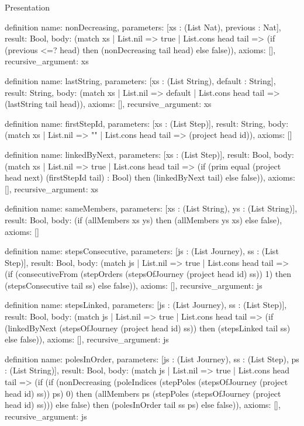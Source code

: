 \begin{lexlean}{Presentation}
\begin{semanticmodule}
definition{
  name: nonDecreasing,
  parameters: [xs : (List Nat), previous : Nat],
  result: Bool,
  body: (match xs
    | List.nil => true
    | List.cons head tail => (if (previous <=? head) then (nonDecreasing tail head) else false)),
  axioms: [],
  recursive_argument: xs
}

definition{
  name: lastString,
  parameters: [xs : (List String), default : String],
  result: String,
  body: (match xs
    | List.nil => default
    | List.cons head tail => (lastString tail head)),
  axioms: [],
  recursive_argument: xs
}

definition{
  name: firstStepId,
  parameters: [xs : (List Step)],
  result: String,
  body: (match xs
    | List.nil => ""
    | List.cons head tail => (project head id)),
  axioms: []
}

definition{
  name: linkedByNext,
  parameters: [xs : (List Step)],
  result: Bool,
  body: (match xs
    | List.nil => true
    | List.cons head tail => (if (prim equal (project head next) (firstStepId tail) : Bool) then (linkedByNext tail) else false)),
  axioms: [],
  recursive_argument: xs
}

definition{
  name: sameMembers,
  parameters: [xs : (List String), ys : (List String)],
  result: Bool,
  body: (if (allMembers xs ys) then (allMembers ys xs) else false),
  axioms: []
}

definition{
  name: stepsConsecutive,
  parameters: [js : (List Journey), ss : (List Step)],
  result: Bool,
  body: (match js
    | List.nil => true
    | List.cons head tail => (if (consecutiveFrom (stepOrders (stepsOfJourney (project head id) ss)) 1) then (stepsConsecutive tail ss) else false)),
  axioms: [],
  recursive_argument: js
}

definition{
  name: stepsLinked,
  parameters: [js : (List Journey), ss : (List Step)],
  result: Bool,
  body: (match js
    | List.nil => true
    | List.cons head tail => (if (linkedByNext (stepsOfJourney (project head id) ss)) then (stepsLinked tail ss) else false)),
  axioms: [],
  recursive_argument: js
}

definition{
  name: polesInOrder,
  parameters: [js : (List Journey), ss : (List Step), ps : (List String)],
  result: Bool,
  body: (match js
    | List.nil => true
    | List.cons head tail => (if (if (nonDecreasing (poleIndices (stepPoles (stepsOfJourney (project head id) ss)) ps) 0) then (allMembers ps (stepPoles (stepsOfJourney (project head id) ss))) else false) then (polesInOrder tail ss ps) else false)),
  axioms: [],
  recursive_argument: js
}


\end{semanticmodule}
\end{lexlean}
